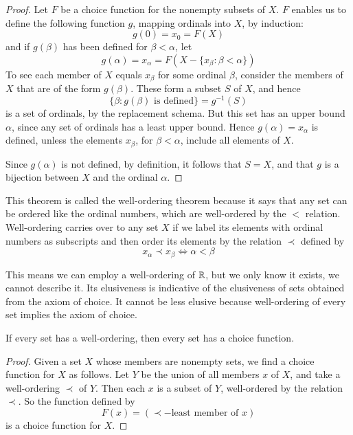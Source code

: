\documentclass[12pt, a4paper, oneside, openright, titlepage]{book}
\begin{document}
\begin{proof}
    Let $F$ be a choice function for the nonempty subsets of $X$. $F$ enables us to define the following function $g$, mapping ordinals into $X$, by induction: $$g(0) = x_0 = F(X)$$
    and if $g(\beta)$ has been defined for $\beta < \alpha$, let $$g(\alpha) = x_{\alpha} = F(X-\{x_{\beta}:\beta < \alpha\})$$
    To see each member of $X$ equals $x_{\beta}$ for some ordinal $\beta$, consider the members of $X$ that are of the form $g(\beta)$. These form a subset $S$ of $X$, and hence \begin{equation*}
        \{\beta:g(\beta)\text{ is defined}\} = g^{-1}(S)
    \end{equation*}
    is a set of ordinals, by the replacement schema. But this set has an upper bound $\alpha$, since any set of ordinals has a least upper bound. Hence $g(\alpha) = x_{\alpha}$ is defined, unless the elements $x_{\beta}$, for $\beta < \alpha$, include all elements of $X$.
     
     Since $g(\alpha)$ is not defined, by definition, it follows that $S = X$, and that $g$ is a bijection between $X$ and the ordinal $\alpha$.
\end{proof}

This theorem is called the well-ordering theorem because it says that any set can be ordered like the ordinal numbers, which are well-ordered by the $<$ relation. Well-ordering carries over to any set $X$ if we label its elements with ordinal numbers as subscripts and then order its elements by the relation $\prec$ defined by $$x_{\alpha} \prec x_{\beta} \iff \alpha < \beta$$

This means we can employ a well-ordering of $\mathbb R$, but we only know it exists, we cannot describe it. Its elusiveness is indicative of the elusiveness of sets obtained from the axiom of choice. It cannot be less elusive because well-ordering of every set implies the axiom of choice.

\begin{thm}
    If every set has a well-ordering, then every set has a choice function.
\end{thm}
\begin{proof}
    Given a set $X$ whose members are nonempty sets, we find a choice function for $X$ as follows. Let $Y$ be the union of all members $x$ of $X$, and take a well-ordering $\prec$ of $Y$. Then each $x$ is a subset of $Y$, well-ordered by the relation $\prec$. So the function defined by \begin{equation*}
        F(x) = (\prec-\text{least member of }x)
    \end{equation*}
    is a choice function for $X$.
\end{proof}
\end{document}
